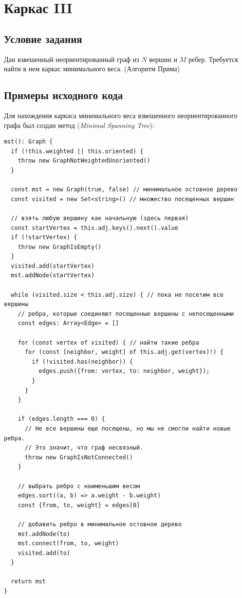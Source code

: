 \section{Каркас III}
\subsection{Условие задания}
Дан взвешенный неориентированный граф из $N$ вершин и $M$ ребер.
Требуется найти в нем каркас минимального веса. (Алгоритм Прима)

\subsection{Примеры исходного кода}
Для нахождения каркаса минимального веса взвешенного неориентированного
графа был создан метод  (\textit{Minimal Spanning Tree}):
\begin{verbatim}
mst(): Graph {
  if (!this.weighted || this.oriented) {
    throw new GraphNotWeightedUnoriented()
  }

  const mst = new Graph(true, false) // минимальное остовное дерево
  const visited = new Set<string>() // множество посещенных вершин

  // взять любую вершину как начальную (здесь первая)
  const startVertex = this.adj.keys().next().value
  if (!startVertex) {
    throw new GraphIsEmpty()
  }
  visited.add(startVertex)
  mst.addNode(startVertex)

  while (visited.size < this.adj.size) { // пока не посетим все вершины
    // ребра, которые соединяют посещенные вершины с непосещенными
    const edges: Array<Edge> = []

    for (const vertex of visited) { // найти такие ребра
      for (const [neighbor, weight] of this.adj.get(vertex)!) {
        if (!visited.has(neighbor)) {
          edges.push({from: vertex, to: neighbor, weight});
        }
      }
    }

    if (edges.length === 0) {
      // Не все вершины еще посещены, но мы не смогли найти новые ребра.
      // Это значит, что граф несвязный.
      throw new GraphIsNotConnected()
    }

    // выбрать ребро с наименьшим весом
    edges.sort((a, b) => a.weight - b.weight)
    const {from, to, weight} = edges[0]

    // добавить ребро в минимальное остовное дерево
    mst.addNode(to)
    mst.connect(from, to, weight)
    visited.add(to)
  }

  return mst
}
\end{verbatim}

